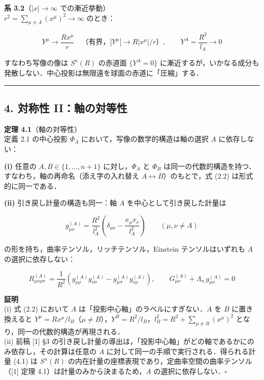 \documentclass[a4paper,11pt]{ltjsarticle}
\theoremstyle{definition}
\begin{document}
\textbf{系 3.2}（\(|x| \to \infty\) での漸近挙動）\\
\(r^2 = \sum_{\mu \neq A}(x^\mu)^2 \to \infty\) のとき：

\[Y^\mu \to \frac{Rx^\mu}{r} \quad \text{（有界，$|Y^\mu| \to R|x^\mu|/r$）}, \qquad Y^A = \frac{R^2}{l_A} \to 0 \tag{3.2}\]

すなわち写像の像は \(S^n(R)\) の赤道面 \(\{Y^A = 0\}\) に漸近するが，いかなる成分も発散しない．中心投影は無限遠を球面の赤道に「圧縮」する．

\begin{center}\rule{0.5\linewidth}{0.5pt}\end{center}

\subsection{4. 対称性 II：軸の対等性}\label{ux5bfeux79f0ux6027-iiux8ef8ux306eux5bfeux7b49ux6027}

\textbf{定理 4.1}（軸の対等性）\\
定義 2.1 の中心投影 \(\Phi_A\) において，写像の数学的構造は軸の選択 \(A\) に依存しない：

\textbf{(i)} 任意の \(A, B \in \{1, \ldots, n+1\}\) に対し，\(\Phi_A\) と \(\Phi_B\) は同一の代数的構造を持つ．すなわち，軸の再命名（添え字の入れ替え \(A \leftrightarrow B\)）のもとで，式 (2.2) は形式的に同一である．

\textbf{(ii)} 引き戻し計量の構造も同一：軸 \(A\) を中心として引き戻した計量は

\[g_{\mu\nu}^{(A)} = \frac{R^2}{l_A^2}\left(\delta_{\mu\nu} - \frac{x_\mu x_\nu}{l_A^2}\right) \qquad (\mu, \nu \neq A) \tag{4.1}\]

の形を持ち，曲率テンソル，リッチテンソル，Einstein テンソルはいずれも \(A\) の選択に依存しない：

\[R_{\mu\nu\rho\sigma}^{(A)} = \frac{1}{R^2}(g_{\mu\rho}^{(A)}g_{\nu\sigma}^{(A)} - g_{\mu\sigma}^{(A)}g_{\nu\rho}^{(A)}), \qquad G_{\mu\nu}^{(A)} + \Lambda_n\, g_{\mu\nu}^{(A)} = 0 \tag{4.2}\]

\textbf{証明}\\
(i) 式 (2.2) において \(A\) は「投影中心軸」のラベルにすぎない．\(A\) を \(B\) に置き換えると \(Y^\mu = Rx^\mu/l_B\)（\(\mu \neq B\)），\(Y^B = R^2/l_B\)，\(l_B^2 = R^2 + \sum_{\mu \neq B}(x^\mu)^2\) となり，同一の代数的構造が再現される．\\
(ii) 前稿 {[}1{]} §3 の引き戻し計量の導出は，「投影中心軸」がどの軸であるかにのみ依存し，その計算は任意の \(A\) に対して同一の手順で実行される．得られる計量 (4.1) は \(S^n(R)\) の内在計量の座標表現であり，定曲率空間の曲率テンソル（{[}1{]} 定理 4.1）は計量のみから決まるため，\(A\) の選択に依存しない．\(\square\)
\end{document}
